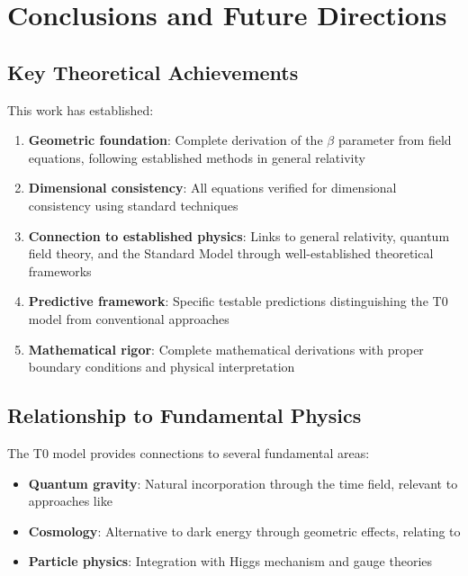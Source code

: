 \documentclass[12pt,a4paper]{article}
\begin{document}
	\section{Conclusions and Future Directions}
	\label{sec:conclusions}
	
	\subsection{Key Theoretical Achievements}
	\label{subsec:key_achievements}
	
	This work has established:
	\begin{enumerate}
		\item \textbf{Geometric foundation}: Complete derivation of the $\beta$ parameter from field equations, following established methods in general relativity \citep{misner1973,carroll2004}
		
		\item \textbf{Dimensional consistency}: All equations verified for dimensional consistency using standard techniques \citep{barenblatt1996}
		
		\item \textbf{Connection to established physics}: Links to general relativity, quantum field theory, and the Standard Model through well-established theoretical frameworks
		
		\item \textbf{Predictive framework}: Specific testable predictions distinguishing the T0 model from conventional approaches
		
		\item \textbf{Mathematical rigor}: Complete mathematical derivations with proper boundary conditions and physical interpretation
	\end{enumerate}
	
	\subsection{Relationship to Fundamental Physics}
	\label{subsec:fundamental_physics}
	
	The T0 model provides connections to several fundamental areas:
	\begin{itemize}
		\item \textbf{Quantum gravity}: Natural incorporation through the time field, relevant to approaches like \citep{thiemann2007,rovelli2004}
		\item \textbf{Cosmology}: Alternative to dark energy through geometric effects, relating to \citep{weinberg2008,peebles1993}
		\item \textbf{Particle physics}: Integration with Higgs mechanism and gauge theories \citep{weinberg2003,peskin1995}
	\end{itemize}
	
\end{document}
